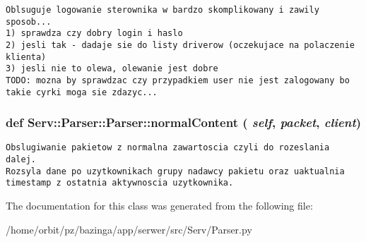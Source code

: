 \footnotesize\begin{verbatim}Oblsuguje logowanie sterownika w bardzo skomplikowany i zawily sposob...
1) sprawdza czy dobry login i haslo
2) jesli tak - dadaje sie do listy driverow (oczekujace na polaczenie klienta)
3) jesli nie to olewa, olewanie jest dobre
TODO: mozna by sprawdzac czy przypadkiem user nie jest zalogowany bo takie cyrki moga sie zdazyc...        
\end{verbatim}
\normalsize
 \hypertarget{class_serv_1_1_parser_1_1_parser_dc1da4d6ff7eb9dbc114f8a426274aa0}{
\subsubsection[{normalContent}]{\setlength{\rightskip}{0pt plus 5cm}def Serv::Parser::Parser::normalContent ( {\em self}, \/   {\em packet}, \/   {\em client})}}
\label{class_serv_1_1_parser_1_1_parser_dc1da4d6ff7eb9dbc114f8a426274aa0}




\footnotesize\begin{verbatim}Obslugiwanie pakietow z normalna zawartoscia czyli do rozeslania dalej.
Rozsyla dane po uzytkownikach grupy nadawcy pakietu oraz uaktualnia timestamp z ostatnia aktywnoscia uzytkownika.         
\end{verbatim}
\normalsize
 

The documentation for this class was generated from the following file:\begin{CompactItemize}
\item 
/home/orbit/pz/bazinga/app/serwer/src/Serv/Parser.py\end{CompactItemize}
